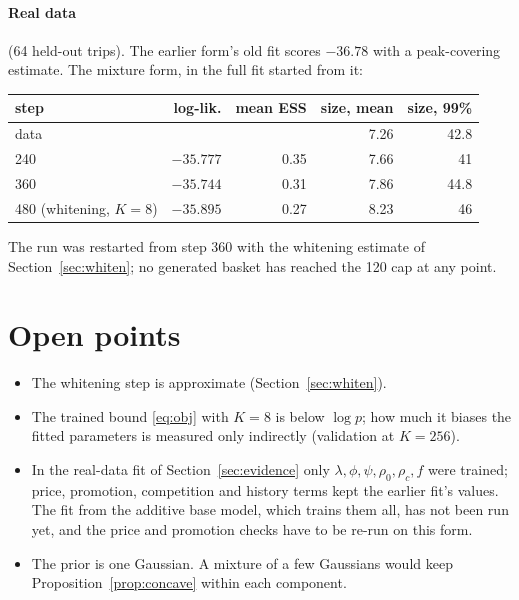 \documentclass[11pt,a4paper]{article}
\theoremstyle{remark}
\begin{document}
\paragraph{Real data} (64 held-out trips). The earlier form's old fit scores $-36.78$ with a peak-covering
estimate. The mixture form, in the full fit started from it:
\begin{center}\small
\begin{tabular}{lrrrr}\toprule
step & log-lik. & mean ESS & size, mean & size, 99\%\\\midrule
data & & & 7.26 & 42.8\\
240 & $-35.777$ & 0.35 & 7.66 & 41\\
360 & $\mathbf{-35.744}$ & 0.31 & 7.86 & 44.8\\
480 (whitening, $K=8$) & $-35.895$ & 0.27 & 8.23 & 46\\\bottomrule
\end{tabular}
\end{center}
The run was restarted from step 360 with the whitening estimate of Section~\ref{sec:whiten}; no generated basket
has reached the 120 cap at any point.

\section{Open points}
\begin{itemize}
\item The whitening step is approximate (Section~\ref{sec:whiten}).
\item The trained bound \eqref{eq:obj} with $K=8$ is below $\log p$; how much it biases the fitted parameters
  is measured only indirectly (validation at $K=256$).
\item In the real-data fit of Section~\ref{sec:evidence} only $\lambda,\phi,\psi,\rho_0,\rho_c,f$ were trained;
  price, promotion, competition and history terms kept the earlier fit's values. The fit from the additive
  base model, which trains them all, has not been run yet, and the price and promotion checks have to be
  re-run on this form.
\item The prior is one Gaussian. A mixture of a few Gaussians would keep Proposition~\ref{prop:concave} within each component.
\end{itemize}
\end{document}
